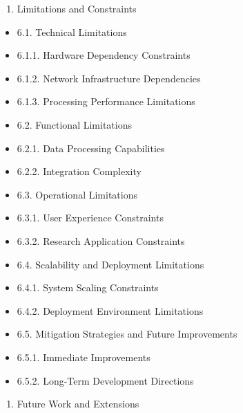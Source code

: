 \documentclass[12pt,a4paper]{report}
\begin{document}
\begin{enumerate}
\item Limitations and Constraints
\end{enumerate}
\begin{itemize}
\item 6.1. Technical Limitations
\item 6.1.1. Hardware Dependency Constraints
\item 6.1.2. Network Infrastructure Dependencies
\item 6.1.3. Processing Performance Limitations
\item 6.2. Functional Limitations
\item 6.2.1. Data Processing Capabilities
\item 6.2.2. Integration Complexity
\item 6.3. Operational Limitations
\item 6.3.1. User Experience Constraints
\item 6.3.2. Research Application Constraints
\item 6.4. Scalability and Deployment Limitations
\item 6.4.1. System Scaling Constraints
\item 6.4.2. Deployment Environment Limitations
\item 6.5. Mitigation Strategies and Future Improvements
\item 6.5.1. Immediate Improvements
\item 6.5.2. Long-Term Development Directions
\end{itemize}
\begin{enumerate}
\item Future Work and Extensions
\end{enumerate}
\end{document}
